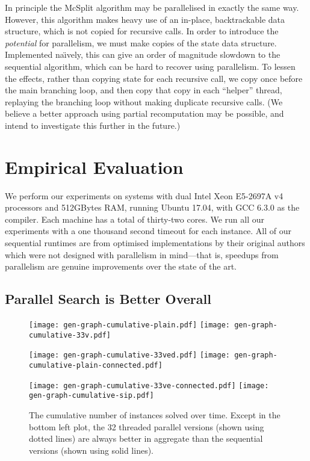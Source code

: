 \documentclass{llncs}
\begin{document}
In principle the McSplit algorithm may be parallelised in exactly the same way. However, this
algorithm makes heavy use of an in-place, backtrackable data structure, which is not copied for
recursive calls. In order to introduce the \emph{potential} for parallelism, we must make
copies of the state data structure. Implemented na{\"\i}vely, this can give an order of magnitude
slowdown to the sequential algorithm, which can be hard to recover using parallelism. To lessen the
effects, rather than copying state for each recursive call, we copy once before the main branching
loop, and then copy that copy in each ``helper'' thread, replaying the branching loop without making
duplicate recursive calls.  (We believe a better approach using partial recomputation may be
possible, and intend to investigate this further in the future.)

\section{Empirical Evaluation}

We perform our experiments on systems with dual Intel Xeon E5-2697A v4 processors and 512GBytes RAM,
running Ubuntu 17.04, with GCC 6.3.0 as the compiler. Each machine has a total of thirty-two cores.
We run all our experiments with a one thousand second timeout for each instance. All of our
sequential runtimes are from optimised implementations by their original authors which were not
designed with parallelism in mind---that is, speedups from parallelism are genuine improvements over
the state of the art.

\subsection{Parallel Search is Better Overall}

\begin{figure}[p]
    \texttt{[image: gen-graph-cumulative-plain.pdf]}
    \hfill
    \texttt{[image: gen-graph-cumulative-33v.pdf]}

    \vspace*{1em}

    \texttt{[image: gen-graph-cumulative-33ved.pdf]}
    \hfill
    \texttt{[image: gen-graph-cumulative-plain-connected.pdf]}

    \vspace*{1em}

    \texttt{[image: gen-graph-cumulative-33ve-connected.pdf]}
    \hfill
    \texttt{[image: gen-graph-cumulative-sip.pdf]}

    \caption{The cumulative number of instances solved over time. Except in the bottom left plot,
    the 32 threaded parallel versions (shown using dotted lines) are always better in aggregate than
    the sequential versions (shown using solid lines).}\label{figure:cumulative}
\end{figure}
\end{document}
